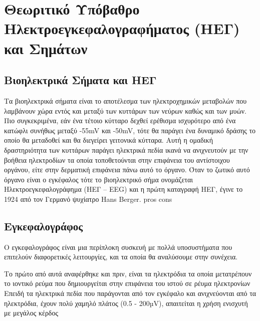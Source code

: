 \documentclass[11pt,a4paper,english,greek,twoside]{../Thesis}
\begin{document}
\chapter{Θεωριτικό Υπόβαθρο Ηλεκτροεγκεφαλογραφήματος (ΗΕΓ) και Σημάτων}
\section{Βιοηλεκτρικά Σήματα και ΗΕΓ}
Τα βιοηλεκτρικά σήματα είναι το αποτέλεσμα των ηλεκτροχημικών μεταβολών που λαμβάνουν χώρα εντός και μεταξύ των κυττάρων των νεύρων καθώς και των μυών. Πιο συγκεκριμένα, εάν ένα τέτοιο κύτταρο δεχθεί ερέθισμα ισχυρότερο από ένα κατώφλι συνήθως μεταξύ  -55mV και -50mV, τότε θα παράγει ένα δυναμικό δράσης το οποίο θα μεταδοθεί και θα διεγείρει γειτονικά κύτταρα. Αυτή η ομαδική δραστηριότητα των κυττάρων παράγει ηλεκτρικά πεδία ικανά να ανιχνευτούν με την βοήθεια ηλεκτροδίων τα οποία τοποθετούνται στην επιφάνεια του αντίστοιχου οργάνου, είτε στην δερματική επιφάνεια πάνω αυτό το όργανο. Όταν το ζωτικό αυτό όργανο είναι ο εγκέφαλος τότε το βιοηλεκτρικό σήμα ονομάζεται Hλεκτροεγκεφαλογράφημα (ΗΕΓ – EEG) και η πρώτη καταγραφή ΗΕΓ, έγινε το 1924 από τον Γερμανό ψυχίατρο Hans Berger. pros cons

\section{Εγκεφαλογράφος}
Ο εγκεφαλογράφος είναι μια περίπλοκη συσκευή με πολλά υποσυστήματα που επιτελούν διαφορετικές λειτουργίες, και τα οποία θα αναλύσουμε στην συνέχεια. \cite{Allison2010BCIBCI}

Το πρώτο από αυτά αναφέρθηκε και πριν, είναι τα ηλεκτρόδια τα οποία μετατρέπουν το ιοντικό ρεύμα που δημιουργείται στην επιφάνεια του ιστού σε ρέυμα ηλεκτρονίων
Επειδή τα ηλεκτρικά πεδία που παράγονται από τον εγκέφαλο και ανιχνεύονται από τα ηλεκτρόδια, έχουν πολύ χαμηλό πλάτος (0.5 - 200µV), απαιτείται η χρήση ενισχυτή με μεγάλος κέρδος
   
\end{document}
